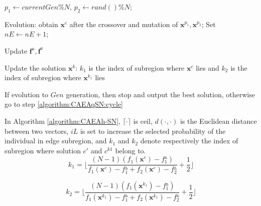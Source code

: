 \documentclass[10pt, journal]{IEEEtran}
\begin{document}
\begin{algorithm}[!htbp]
%
%
%
   {  $p_1 \leftarrow currentGen \% N$,
      $p_2 \leftarrow rand() \% N$;}  \label{algorithm:CAEAqSN:cycle}

    {Evolution: obtain $\textbf{x}^c$ after the crossover and mutation of $\textbf{x}^{p_1},\textbf{x}^{p_2}$; Set $nE \leftarrow nE+1$;}

    {Update $\mathbf{f}^{\vartriangle},\mathbf{f}^{\triangledown}$}


    {Update the solution $\textbf{x}^k$:
     $k_1$ is the index of subregion where $\textbf{x}^c$ lies and $k_2$ is the index of subregion where $\textbf{x}^{k_1}$ lies
    }


    {If evolution to $Gen$ generation, then stop and output the best solution, otherwise go to step \ref{algorithm:CAEAqSN:cycle} \label{algorithm:CAEAqSN:end}}

\end{algorithm}

In Algorithm \ref{algorithm:CAEAh-SN}, $\lceil \cdot \rceil$ is ceil, $d(\cdot, \cdot)$ is the Euclidean distance between two vectors, $iL$ is set to increase the selected probability of the individual in edge subregion, and $k_1$ and $k_2$ denote respectively the index of subregion where solution $c'$ and $c^{k1}$ belong to.
\begin{equation}
k_1 =\lfloor \frac{(N-1)(f_1(\textbf{x}^c)-f{_1^{\vartriangle}})}{f_1(\textbf{x}^c)-f{_1^{\vartriangle}}+f_2(\textbf{x}^c)-f{_2^{\vartriangle}}} +\frac{1}{2} \rfloor
\end{equation}

\begin{equation}
k_2 = \lfloor \frac{(N-1)(f_1(\textbf{x}^{k_1})-f{_1^{\vartriangle}})}{f_1(\textbf{x}^{k_1})-f{_1^{\vartriangle}}+f_2(\textbf{x}^{k_1})-f{_2^{\vartriangle}}} +\frac{1}{2} \rfloor
\end{equation}
\end{document}
